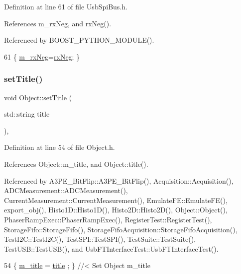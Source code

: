 Definition at line 61 of file Usb\+Spi\+Bus.\+h.



References m\+\_\+rx\+Neg, and rx\+Neg().



Referenced by B\+O\+O\+S\+T\+\_\+\+P\+Y\+T\+H\+O\+N\+\_\+\+M\+O\+D\+U\+L\+E().


\begin{DoxyCode}
61 \{ \hyperlink{classUsbSpiBus_abf36f2df24c3ec5363efe73c9771bbc8}{m\_rxNeg}=\hyperlink{classUsbSpiBus_ab24f6e85697305b26997b8dec3f18254}{rxNeg}; \}
\end{DoxyCode}
\mbox{\label{classObject_a89557dbbad5bcaa02652f5d7fa35d20f}} 
\subsubsection{\texorpdfstring{set\+Title()}{setTitle()}}
{\footnotesize\ttfamily void Object\+::set\+Title (\begin{DoxyParamCaption}\item[{std\+::string}]{title }\end{DoxyParamCaption})\hspace{0.3cm}{\ttfamily [inline]}, {\ttfamily [inherited]}}



Definition at line 54 of file Object.\+h.



References Object\+::m\+\_\+title, and Object\+::title().



Referenced by A3\+P\+E\+\_\+\+Bit\+Flip\+::\+A3\+P\+E\+\_\+\+Bit\+Flip(), Acquisition\+::\+Acquisition(), A\+D\+C\+Measurement\+::\+A\+D\+C\+Measurement(), Current\+Measurement\+::\+Current\+Measurement(), Emulate\+F\+E\+::\+Emulate\+F\+E(), export\+\_\+obj(), Histo1\+D\+::\+Histo1\+D(), Histo2\+D\+::\+Histo2\+D(), Object\+::\+Object(), Phaser\+Ramp\+Exec\+::\+Phaser\+Ramp\+Exec(), Register\+Test\+::\+Register\+Test(), Storage\+Fifo\+::\+Storage\+Fifo(), Storage\+Fifo\+Acquisition\+::\+Storage\+Fifo\+Acquisition(), Test\+I2\+C\+::\+Test\+I2\+C(), Test\+S\+P\+I\+::\+Test\+S\+P\+I(), Test\+Suite\+::\+Test\+Suite(), Test\+U\+S\+B\+::\+Test\+U\+S\+B(), and Usb\+F\+T\+Interface\+Test\+::\+Usb\+F\+T\+Interface\+Test().


\begin{DoxyCode}
54 \{ \hyperlink{classObject_affbeea1953eb5163573b92fad8f75727}{m\_title} = \hyperlink{classObject_a73a0f1a41828fdd8303dd662446fb6c3}{title} ; \} \textcolor{comment}{//< Set Object m\_title}
\end{DoxyCode}
\mbox{\label{classUsbSpiBus_a6b15114d79e0d8002ba42f0301ff22a1}} 
